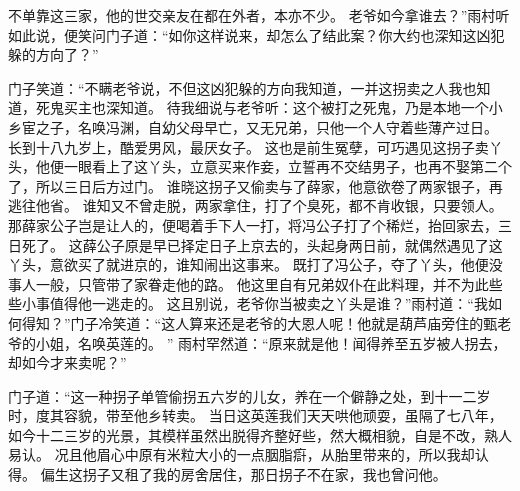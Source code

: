 不单靠这三家，他的世交亲友在都在外者，本亦不少。
老爷如今拿谁去？”雨村听如此说，便笑问门子道：“如你这样说来，却怎么了结此案？你大约也深知这凶犯躲的方向了？”\par
门子笑道：“不瞒老爷说，不但这凶犯躲的方向我知道，一并这拐卖之人我也知道，死鬼买主也深知道。
待我细说与老爷听：这个被打之死鬼，乃是本地一个小乡宦之子，名唤冯渊，自幼父母早亡，又无兄弟，只他一个人守着些薄产过日。
长到十八九岁上，酷爱男风，最厌女子。
这也是前生冤孽，可巧遇见这拐子卖丫头，他便一眼看上了这丫头，立意买来作妾，立誓再不交结男子，也再不娶第二个了，所以三日后方过门。
谁晓这拐子又偷卖与了薛家，他意欲卷了两家银子，再逃往他省。
谁知又不曾走脱，两家拿住，打了个臭死，都不肯收银，只要领人。
那薛家公子岂是让人的，便喝着手下人一打，将冯公子打了个稀烂，抬回家去，三日死了。
这薛公子原是早已择定日子上京去的，头起身两日前，就偶然遇见了这丫头，意欲买了就进京的，谁知闹出这事来。
既打了冯公子，夺了丫头，他便没事人一般，只管带了家眷走他的路。
他这里自有兄弟奴仆在此料理，并不为此些些小事值得他一逃走的。
这且别说，老爷你当被卖之丫头是谁？”雨村道：“我如何得知？”门子冷笑道：“这人算来还是老爷的大恩人呢！他就是葫芦庙旁住的甄老爷的小姐，名唤英莲的。
”
雨村罕然道：“原来就是他！闻得养至五岁被人拐去，却如今才来卖呢？”\par
门子道：“这一种拐子单管偷拐五六岁的儿女，养在一个僻静之处，到十一二岁时，度其容貌，带至他乡转卖。
当日这英莲我们天天哄他顽耍，虽隔了七八年，如今十二三岁的光景，其模样虽然出脱得齐整好些，然大概相貌，自是不改，熟人易认。
况且他眉心中原有米粒大小的一点胭脂㾵，从胎里带来的，所以我却认得。
偏生这拐子又租了我的房舍居住，那日拐子不在家，我也曾问他。
